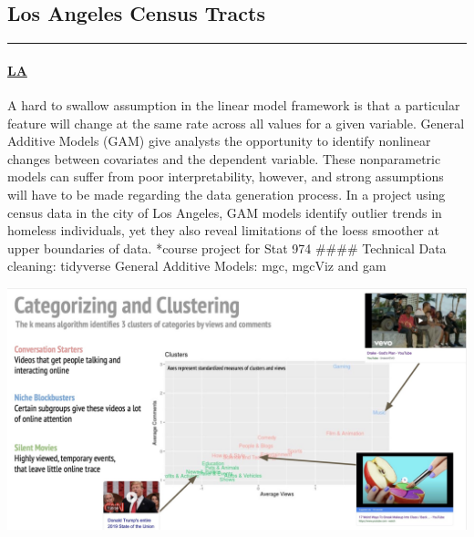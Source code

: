 \documentclass[
]{article}
\begin{document}
\hypertarget{los-angeles-census-tracts}{%
\subsection{Los Angeles Census Tracts}\label{los-angeles-census-tracts}}

\begin{center}\rule{0.5\linewidth}{0.5pt}\end{center}

\begin{row}

\begin{col-sm-6}

\hypertarget{la}{%
\paragraph{\texorpdfstring{\href{https://katjanewilson.github.io/WhartonAnalytics-MLB/}{LA}}{LA}}\label{la}}

A hard to swallow assumption in the linear model framework is that a
particular feature will change at the same rate across all values for a
given variable. General Additive Models (GAM) give analysts the
opportunity to identify nonlinear changes between covariates and the
dependent variable. These nonparametric models can suffer from poor
interpretability, however, and strong assumptions will have to be made
regarding the data generation process. In a project using census data in
the city of Los Angeles, GAM models identify outlier trends in homeless
individuals, yet they also reveal limitations of the loess smoother at
upper boundaries of data. *course project for Stat 974 \#\#\#\#
Technical Data cleaning: tidyverse General Additive Models: mgc, mgcViz
and gam

\end{col-sm-6}

\begin{col-sm-6}

\includegraphics[width=800px]{images/image2}

\end{col-sm-6}

\end{row}
\end{document}
